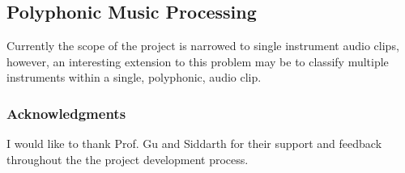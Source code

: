 \documentclass{article}
\begin{document}
\subsection{Polyphonic Music Processing}
Currently the scope of the project is narrowed to single instrument audio clips, however, an interesting extension to this problem may be to classify multiple instruments within a single, polyphonic, audio clip.

\subsubsection*{Acknowledgments}

I would like to thank Prof. Gu and Siddarth for their support and
feedback throughout the the project development
process.

\end{document}
